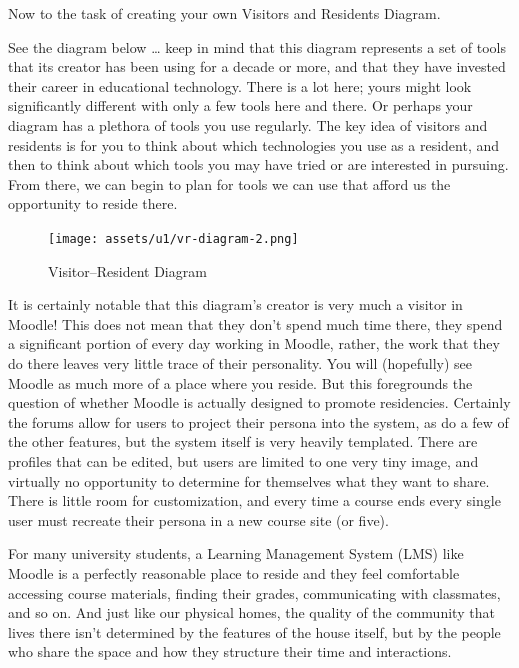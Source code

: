 \documentclass[
  letterpaper,
  DIV=11,
  numbers=noendperiod]{scrreprt}
\begin{document}
Now to the task of creating your own Visitors and Residents Diagram.

See the diagram below \ldots{} keep in mind that this diagram represents
a set of tools that its creator has been using for a decade or more, and
that they have invested their career in educational technology. There is
a lot here; yours might look significantly different with only a few
tools here and there. Or perhaps your diagram has a plethora of tools
you use regularly. The key idea of visitors and residents is for you to
think about which technologies you use as a resident, and then to think
about which tools you may have tried or are interested in pursuing. From
there, we can begin to plan for tools we can use that afford us the
opportunity to reside there.

\begin{figure}

\caption{\label{fig-vrxdiagramx2}Visitor--Resident Diagram}

\texttt{[image: assets/u1/vr-diagram-2.png]}

\end{figure}%

It is certainly notable that this diagram's creator is very much a
visitor in Moodle! This does not mean that they don't spend much time
there, they spend a significant portion of every day working in Moodle,
rather, the work that they do there leaves very little trace of their
personality. You will (hopefully) see Moodle as much more of a place
where you reside. But this foregrounds the question of whether Moodle is
actually designed to promote residencies. Certainly the forums allow for
users to project their persona into the system, as do a few of the other
features, but the system itself is very heavily templated. There are
profiles that can be edited, but users are limited to one very tiny
image, and virtually no opportunity to determine for themselves what
they want to share. There is little room for customization, and every
time a course ends every single user must recreate their persona in a
new course site (or five).

For many university students, a Learning Management System (LMS) like
Moodle is a perfectly reasonable place to reside and they feel
comfortable accessing course materials, finding their grades,
communicating with classmates, and so on. And just like our physical
homes, the quality of the community that lives there isn't determined by
the features of the house itself, but by the people who share the space
and how they structure their time and interactions.
\end{document}
